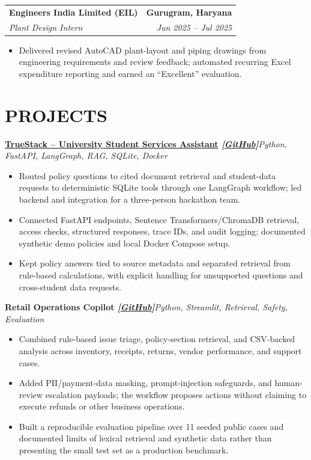 \documentclass[10pt,a4paper]{article}
\makeatletter
\newcommand{\resumeSubheading}[4]{%
  \begin{tabular*}{\textwidth}{@{}l@{\extracolsep{\fill}}r@{}}
    \textbf{#1} & \textbf{#2} \\
    \textit{#3} & \textit{#4}
  \end{tabular*}\vspace{-3pt}
}
\newcommand{\resumeProject}[2]{%
  \textbf{#1}\hfill{\small\textit{#2}}\vspace{-3pt}
}
\makeatother
\begin{document}
\resumeSubheading
  {Engineers India Limited (EIL)}{Gurugram, Haryana}
  {Plant Design Intern}{Jun 2025 -- Jul 2025}
\begin{itemize}
  \item Delivered revised AutoCAD plant-layout and piping drawings from engineering requirements and review feedback; automated recurring Excel expenditure reporting and earned an ``Excellent'' evaluation.
\end{itemize}

\section*{PROJECTS}

\resumeProject
  {\href{https://nothing0g.github.io/analyst/projects/truestack-ai-assistant/}{TrueStack -- University Student Services Assistant}
  \hspace{3pt}\textnormal{\textbf{\textit{[\href{https://github.com/Nothing0g/TrueStack_HCLTech_aiHackathon}{GitHub}]}}}}
  {Python, FastAPI, LangGraph, RAG, SQLite, Docker}
\begin{itemize}
  \item Routed policy questions to cited document retrieval and student-data requests to deterministic SQLite tools through one LangGraph workflow; led backend and integration for a three-person hackathon team.
  \item Connected FastAPI endpoints, Sentence Transformers/ChromaDB retrieval, access checks, structured responses, trace IDs, and audit logging; documented synthetic demo policies and local Docker Compose setup.
  \item Kept policy answers tied to source metadata and separated retrieval from rule-based calculations, with explicit handling for unsupported questions and cross-student data requests.
\end{itemize}

\resumeProject
  {Retail Operations Copilot \hspace{3pt}\textnormal{\textbf{\textit{[\href{https://github.com/Nothing0g/testing_case}{GitHub}]}}}}
  {Python, Streamlit, Retrieval, Safety, Evaluation}
\begin{itemize}
  \item Combined rule-based issue triage, policy-section retrieval, and CSV-backed analysis across inventory, receipts, returns, vendor performance, and support cases.
  \item Added PII/payment-data masking, prompt-injection safeguards, and human-review escalation payloads; the workflow proposes actions without claiming to execute refunds or other business operations.
  \item Built a reproducible evaluation pipeline over 11 seeded public cases and documented limits of lexical retrieval and synthetic data rather than presenting the small test set as a production benchmark.
\end{itemize}
\end{document}

